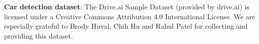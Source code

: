 \documentclass[11pt]{article}
\begin{document}
    \textbf{Car detection dataset}: {The Drive.ai Sample Dataset} (provided
by drive.ai) is licensed under a Creative Commons Attribution 4.0
International License. We are especially grateful to Brody Huval, Chih
Hu and Rahul Patel for collecting and providing this dataset.


    
    
    
    
\end{document}

